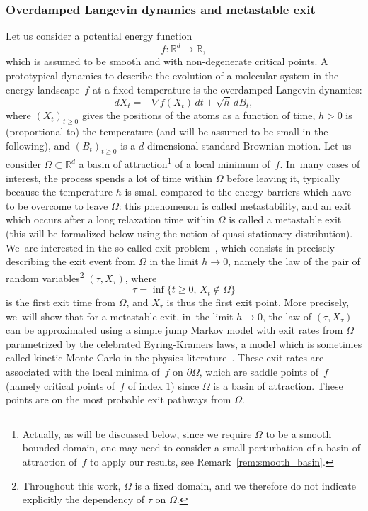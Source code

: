 \documentclass[10pt]{amsart}
\theoremstyle{plain}
\theoremstyle{definition}
\begin{document}
\subsubsection*{Overdamped Langevin dynamics and metastable exit} Let us consider a
potential energy function
\[
f:\mathbb R^d \to \mathbb R,
\]
which is assumed to be smooth and with non-degenerate critical points.
A prototypical dynamics to describe the evolution of a molecular
system in the energy landscape~$f$ at a fixed temperature is the
overdamped Langevin dynamics:
\begin{equation}\label{eq.langevin}
dX_t=-\nabla f(X_t) \, dt +\sqrt h \, dB_t,
\end{equation}
where $(X_t)_{t\ge 0}$ gives the positions of the atoms as a function
of time, $h>0$ is (proportional to) the temperature (and will be assumed to be small in the following),
and $(B_t)_{t\ge 0}$ is a $d$-dimensional standard Brownian
motion. Let us consider $\Omega \subset \mathbb R^d$ a basin of
attraction\footnote{\label{fn:1}Actually, as will be discussed below, since we
require $\Omega$ to be a smooth bounded domain, one may need to
consider a small perturbation of a basin of attraction of~$f$ to
apply our results, see Remark~\ref{rem:smooth_basin}.} of a local
minimum of~$f$. In~many cases of interest, the process spends a lot
of time within $\Omega$ before leaving it, typically because
the temperature $h$ is
small compared to the energy barriers which have to be overcome to
leave $\Omega$: this phenomenon is called metastability, and an exit
which occurs after a long relaxation time within $\Omega$ is called a
metastable exit (this will be formalized below using the notion of
quasi-stationary distribution). We~are interested in the so-called exit
problem~\cite{FrWe}, which consists in
precisely describing the exit event from $\Omega$ in the limit $h\to 0$, namely the law of the pair of random
variables\footnote{Throughout this work, $\Omega$ is a fixed domain, and
we therefore do not indicate explicitly the dependency of $\tau$
on $\Omega$.}
$(\tau,X_{\tau})$, where
\begin{equation}\label{eq:tau}
\tau=\inf\{t\ge 0, \, X_t\notin \Omega\}
\end{equation}
is the first exit time from $\Omega$, and $X_\tau$ is thus the first
exit point.
More precisely, we~will show that for a metastable exit, in~the limit
$h \to 0$, the law of $(\tau,X_{\tau})$ can be
approximated using a simple jump Markov model with exit rates from
$\Omega$ parametrized by the celebrated Eyring-Kramers laws, a model
which is sometimes called kinetic Monte Carlo in the physics
literature~\cite{voter-05}. These exit rates are associated with the
local minima of~$f$ on $\partial \Omega$, which are saddle points of~$f$ (namely critical points of~$f$ of index $1$) since $\Omega$ is a
basin of attraction. These points are on the most probable exit pathways from $\Omega$.
\end{document}
